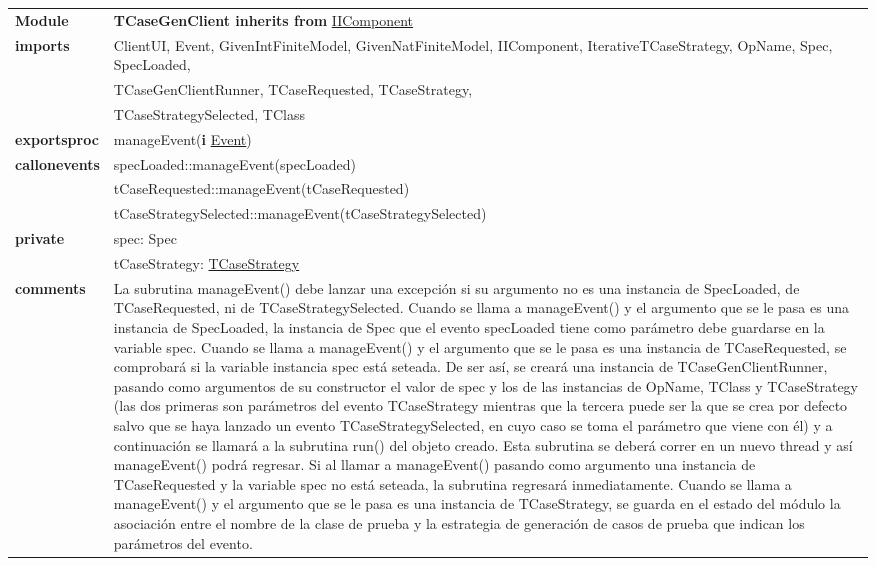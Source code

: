 \documentclass[12pt,a4paper,fleqn]{report}
\newenvironment{hmodule}[2]{\hypertarget{mi:#1}{} \vspace{0.5cm}\noindent\begin{tabular}{|p{0.2\textwidth} p{0.75\textwidth}|} \hline{\bf Module} & {\bf #1 inherits from} \hyperlink{mi:#2}{#2} \\}{\hline\end{tabular}\vspace{0.5cm}}
\newcommand{\eproc}{{\bf exportsproc}}
\newcommand{\callonev}{{\bf callonevents}}
\newcommand{\priv}{{\bf private}}
\newcommand{\proc}[1]{& #1 \\}
\newcommand{\e}[1]{{\bf i} \hyperlink{mi:#1}{#1}}
\newcommand{\imp}[1]{{\bf imports} & #1 \\}
\newcommand{\comm}[1]{{\bf comments} & #1 \\}
\newcommand{\mdr}[1]{\hyperlink{mi:#1}{#1}}
\newcommand{\extraline}[1]{& #1 \\}
\begin{document}
\begin{hmodule}{TCaseGenClient}{IIComponent}
\imp{ClientUI, Event, GivenIntFiniteModel, GivenNatFiniteModel, IIComponent, IterativeTCaseStrategy, OpName, Spec, SpecLoaded,}
\extraline{TCaseGenClientRunner, TCaseRequested, TCaseStrategy,}
\extraline{TCaseStrategySelected, TClass}
\eproc
\proc{manageEvent(\e {Event})}
\callonev
\proc{specLoaded::manageEvent(specLoaded)}
\proc{tCaseRequested::manageEvent(tCaseRequested)}
\proc{tCaseStrategySelected::manageEvent(tCaseStrategySelected)}
\priv
\proc{spec: Spec}
\proc{tCaseStrategy: \mdr{TCaseStrategy}}
\comm{La subrutina manageEvent() debe lanzar una excepción si su argumento no es una instancia de SpecLoaded, de TCaseRequested, ni de TCaseStrategySelected. Cuando se llama a manageEvent() y el argumento que se le pasa es una instancia de SpecLoaded, la instancia de Spec que el evento specLoaded tiene como parámetro debe guardarse en la variable spec. Cuando se llama a manageEvent() y el argumento que se le pasa es una instancia de TCaseRequested, se comprobará si la variable instancia spec está seteada. De ser así, se creará una instancia de TCaseGenClientRunner, pasando como argumentos de su constructor el valor de spec y los de las instancias de OpName, TClass y TCaseStrategy (las dos primeras son parámetros del evento TCaseStrategy mientras que la tercera puede ser la que se crea por defecto salvo que se haya lanzado un evento TCaseStrategySelected, en cuyo caso se toma el parámetro que viene con él) y a continuación se llamará a la subrutina run() del objeto creado. Esta subrutina se deberá correr en un nuevo thread y así manageEvent() podrá regresar. Si al llamar a manageEvent() pasando como argumento una instancia de TCaseRequested y la variable spec no está seteada, la subrutina regresará inmediatamente. Cuando se llama a manageEvent() y el argumento que se le pasa es una instancia de TCaseStrategy, se guarda en el estado del módulo la asociación entre el nombre de la clase de prueba y la estrategia de generación de casos de prueba que indican los parámetros del evento.}
\end{hmodule}
\end{document}
